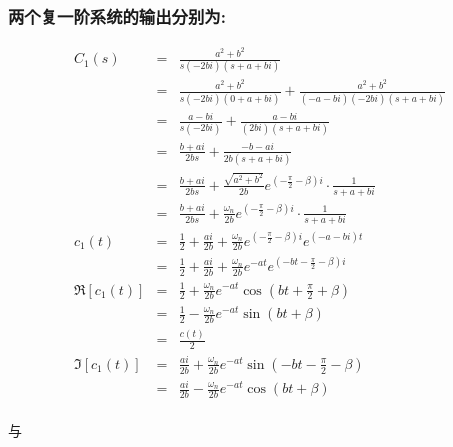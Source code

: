 \documentclass{article}
\begin{document}
\begin{frame}
\frametitle{两个复一阶系统的输出分别为:}
\label{sec-2-1-4}

\begin{eqnarray*}
C_1(s) &=& \frac{a^2+b^2}{s(-2bi)(s+a+bi)}\\
     &=& \frac{a^2+b^2}{s(-2bi)(0+a+bi)}+\frac{a^2+b^2}{(-a-bi)(-2bi)(s+a+bi)}\\
     &=& \frac{a-bi}{s(-2bi)}+\frac{a-bi}{(2bi)(s+a+bi)}\\
     &=& \frac{b+ai}{2bs}+\frac{-b-ai}{2b(s+a+bi)}\\
     &=& \frac{b+ai}{2bs}+\frac{\sqrt{a^2+b^2}}{2b}e^{(-\frac{\pi}{2}-\beta)i}\cdot\frac{1}{s+a+bi} \\
     &=& \frac{b+ai}{2bs}+\frac{\omega_n}{2b}e^{(-\frac{\pi}{2}-\beta)i}\cdot\frac{1}{s+a+bi} \\
c_1(t) &=& \frac{1}{2}+\frac{ai}{2b}+\frac{\omega_n}{2b}e^{(-\frac{\pi}{2}-\beta)i}e^{(-a-bi)t} \\
     &=& \frac{1}{2}+\frac{ai}{2b}+\frac{\omega_n}{2b}e^{-at} e^{(-bt-\frac{\pi}{2}-\beta)i}\\
\Re[c_1(t)] &=& \frac{1}{2}+\frac{\omega_n}{2b}e^{-at}\cos(bt+\frac{\pi}{2}+\beta)\\
            &=& \frac{1}{2}-\frac{\omega_n}{2b}e^{-at}\sin(bt+\beta)\\
            &=& \frac{c(t)}{2}\\
\Im[c_1(t)] &=& \frac{ai}{2b}+\frac{\omega_n}{2b}e^{-at} \sin(-bt-\frac{\pi}{2}-\beta)\\
            &=& \frac{ai}{2b}-\frac{\omega_n}{2b}e^{-at} \cos(bt+\beta)\\
\end{eqnarray*}

与


\end{frame}
\end{document}
